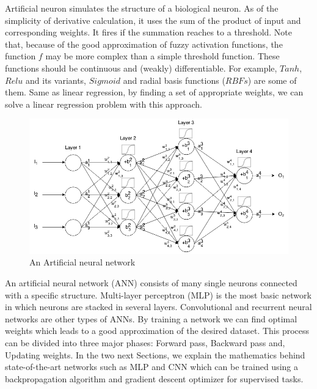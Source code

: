 \documentclass[10pt]{SelfArx} %
\begin{document}
	
	
	Artificial neuron simulates the structure of a biological neuron. As of the simplicity of derivative calculation, it uses the sum of the product of input and corresponding weights. It fires if the summation reaches to a threshold. Note that, because of the good approximation of fuzzy activation functions, the function $f$ may be more complex than a simple threshold function. These functions should be continuous and (weakly) differentiable. For example, $Tanh$, $Relu$ and its variants, $Sigmoid$ and radial basis functions ($RBFs$) are some of them. Same as linear regression, by finding a set of appropriate weights, we can solve a linear regression problem with this approach.
	
	\begin{figure}\centering %
		\includegraphics[width=\linewidth]{img/ann}
		\caption{An Artificial neural network}	
	\end{figure}
	
	An artificial neural network (ANN) consists of many single neurons connected with a specific structure. Multi-layer perceptron (MLP) is the most basic network in which neurons are stacked in several layers. Convolutional and recurrent neural networks are other types of ANNs. By training a network we can find optimal weights which leads to a good approximation of the desired dataset. This process can be divided into three major phases:
	Forward pass, Backward pass and, Updating weights. In the two next Sections, we explain the mathematics behind state-of-the-art networks such as MLP and CNN which can be trained using a backpropagation algorithm and gradient descent optimizer for supervised tasks.
	
\end{document}
